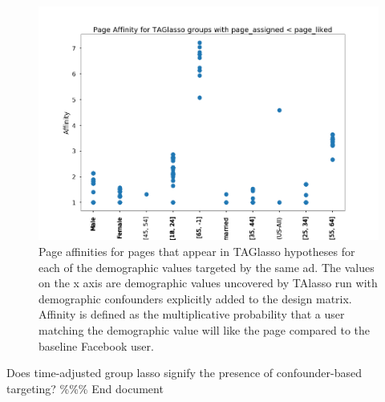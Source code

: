 \documentclass[]{article}
\begin{document}
\begin{figure}
        \centering
        \includegraphics{images/affinity.png}
        \caption{Page affinities for pages that appear in TAGlasso hypotheses for each of the demographic values targeted by the same ad. The values on the x axis are demographic values uncovered by TAlasso run with demographic confounders explicitly added to the design matrix. Affinity is defined as the multiplicative probability that a user matching the demographic value will like the page compared to the baseline Facebook user.}
        \label{fig:affinity}
\end{figure}

Does time-adjusted group lasso signify the presence of confounder-based
targeting? \%\%\% End document

\printbibliography
\end{document}
